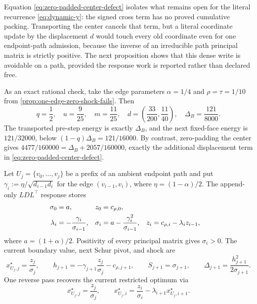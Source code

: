 Equation \cref{eq:zero-padded-center-defect} isolates what remains open for
the literal recurrence \cref{eq:dynamic-y}: the signed cross term has no
proved cumulative packing.  Transporting the center cancels that term, but a
literal coordinate update by the displacement $d$ would touch every old
coordinate even for one endpoint-path admission, because the inverse of an
irreducible path principal matrix is strictly positive.  The next proposition shows
that this dense write is avoidable on a path, provided the response work is
reported rather than declared free.

As an exact rational check, take the edge parameters
$\alpha=1/4$ and $\rho=\tau=1/10$ from
\cref{prop:one-edge-zero-shock-fails}.  Then
\begin{equation*}
 q=\frac12,\quad
 u=\frac9{25},\quad
 m=\frac{11}{25},\quad
 d=\left(\frac{33}{200},\frac{11}{40}\right),\quad
 \Delta_B=\frac{121}{8000}.
\end{equation*}
The transported pre-step energy is exactly $\Delta_B$, and the next
fixed-face energy is $121/32000$, below
$(1-q)\Delta_B=121/16000$.  By contrast, zero-padding the center gives
$4477/160000=\Delta_B+2057/160000$, exactly the additional displacement term
in \cref{eq:zero-padded-center-defect}.

Let $U_j=\{v_0,\ldots,v_j\}$ be a prefix of an ambient endpoint path and put
$\gamma_i:=\eta/\sqrt{d_{i-1}d_i}$ for the edge
$(v_{i-1},v_i)$, where $\eta=(1-\alpha)/2$.  The append-only
$LDL^\top$ response stores
\begin{align}
 \sigma_0&=a,& z_0&=c_{\rho,0},
 \notag\\
 \lambda_i&=-\frac{\gamma_i}{\sigma_{i-1}},&
 \sigma_i&=a-\frac{\gamma_i^2}{\sigma_{i-1}},&
 z_i&=c_{\rho,i}-\lambda_i z_{i-1},
 \label{eq:path-append-ldl}
\end{align}
where $a=(1+\alpha)/2$.  Positivity of every principal matrix gives
$\sigma_i>0$.  The current boundary value, next Schur pivot, and shock are
\begin{equation}
 x_{U_j,j}^\star=\frac{z_j}{\sigma_j},
 \qquad
 h_{j+1}=-\gamma_{j+1}\frac{z_j}{\sigma_j}-c_{\rho,j+1},
 \qquad
 S_{j+1}=\sigma_{j+1},
 \qquad
 \Delta_{j+1}=\frac{h_{j+1}^2}{2\sigma_{j+1}}.
 \label{eq:path-schur-query}
\end{equation}
One reverse pass recovers the current restricted optimum via
\begin{equation}
 x_{U_j,j}^\star=\frac{z_j}{\sigma_j},
 \qquad
 x_{U_j,i}^\star=\frac{z_i}{\sigma_i}
                         -\lambda_{i+1}x_{U_j,i+1}^\star.
 \label{eq:path-response-apply}
\end{equation}

